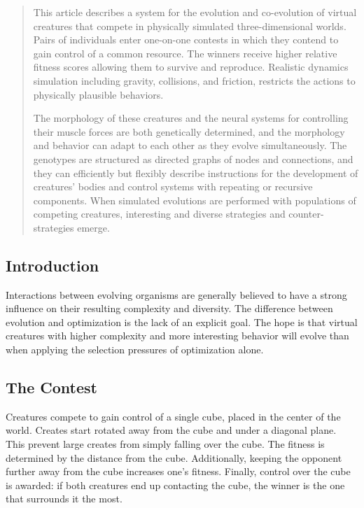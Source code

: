 \documentclass[../main.tex]{subfiles}
\begin{document}
\begin{mdframed}
\end{mdframed}

\begin{abstract}
This article describes a system for the evolution and co-evolution of virtual creatures that compete in physically
simulated three-dimensional worlds. Pairs of individuals enter one-on-one contests in which they contend to gain
control of a common resource. The winners receive higher relative fitness scores allowing them to survive and
reproduce. Realistic dynamics simulation including gravity, collisions, and friction, restricts the actions to
physically plausible behaviors.

The morphology of these creatures and the neural systems for controlling their muscle forces are both genetically
determined, and the morphology and behavior can adapt to each other as they evolve simultaneously. The genotypes are
structured as directed graphs of nodes and connections, and they can efficiently but flexibly describe instructions for
the development of creatures' bodies and control systems with repeating or recursive components. When simulated
evolutions are performed with populations of competing creatures, interesting and diverse strategies and counter-
strategies emerge.

\end{abstract}

\subsection{Introduction}

Interactions between evolving organisms are generally believed to have a strong influence on their resulting complexity
and diversity. The difference between evolution and optimization is the lack of an explicit goal. The hope is that
virtual creatures with higher complexity and more interesting behavior will evolve than when applying the selection
pressures of optimization alone.

\subsection{The Contest}

Creatures compete to gain control of a single cube, placed in the center of the world. Creates start rotated away from
the cube and under a diagonal plane. This prevent large creates from simply falling over the cube. The fitness is
determined by the distance from the cube. Additionally, keeping the opponent further away from the cube increases one's
fitness. Finally, control over the cube is awarded: if both creatures end up contacting the cube, the winner is the one
that surrounds it the most.
\end{document}
